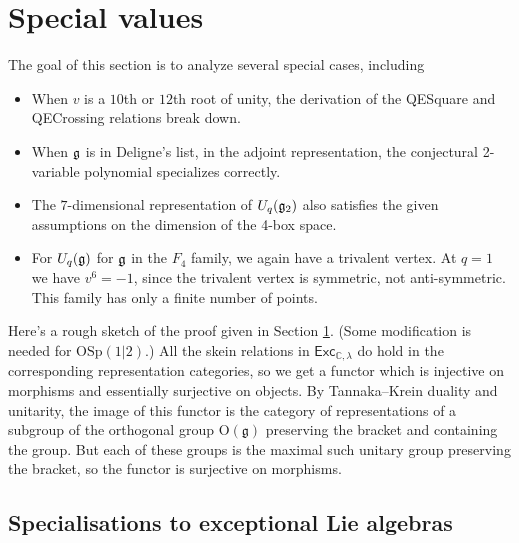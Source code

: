 \documentclass[12pt]{amsart}
\begin{document}
\section{Special values}
\label{sec:special-values}

The goal of this section is to analyze several special cases,
including
\begin{itemize}
\item When $v$ is a $10$th or $12$th root of unity, the
  derivation of the QESquare and QECrossing relations break down.
\item When ${\mathfrak g}$ is in Deligne's list, in the adjoint
  representation, the conjectural 2-variable polynomial specializes
  correctly.
\item The $7$-dimensional representation of $U_q({\mathfrak g}_2)$ also
  satisfies the given assumptions on the dimension of the 4-box space.
\item For $U_q({\mathfrak g})$ for ${\mathfrak g}$ in the $F_4$ family, we again have a
  trivalent vertex. At $q=1$ we have $v^6 = -1$, since the trivalent
  vertex is symmetric, not anti-symmetric. This family has only a
  finite number of points.
\end{itemize}

Here's a rough sketch of the proof given in Section \ref{sec:special-values}.
(Some modification is
needed for $\mathrm{OSp}(1|2)$.)  All the skein relations in
$\mathsf{Exc}_{\mathbb{C},\lambda}$ do hold in the corresponding
representation categories, so we get a functor which is injective on morphisms
and essentially surjective on objects.  By Tannaka--Krein duality and
unitarity, the image of this functor is the category of representations of a
subgroup of the orthogonal group $\mathrm{O}(\mathfrak{g})$ preserving the bracket and containing
the group.  But each of these groups is the maximal such unitary group
preserving the bracket, so the functor is surjective on morphisms.


\subsection{Specialisations to exceptional Lie algebras}%

\end{document}
